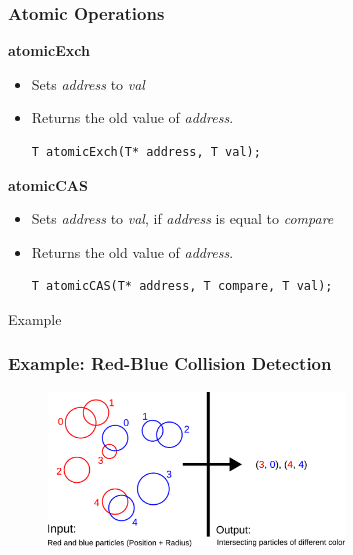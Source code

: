 \documentclass[aspectratio=169,handout]{beamer}
\begin{document}
\begin{frame}[fragile]
\frametitle{Atomic Operations}

\textbf{atomicExch}
\begin{itemize}
	\item Sets \textit{address} to \textit{val}
	\item Returns the old value of \textit{address}.
\begin{lstlisting}
T atomicExch(T* address, T val);
\end{lstlisting}
\end{itemize}

\textbf{atomicCAS}
\begin{itemize}
	\item Sets \textit{address} to \textit{val}, if \textit{address} is equal to \textit{compare}
	\item Returns the old value of \textit{address}.
\begin{lstlisting}
T atomicCAS(T* address, T compare, T val);
\end{lstlisting}
\end{itemize}
\end{frame}


\begin{frame}[fragile]
\begin{center}
\Large Example
\end{center}
\end{frame}


\frame
{
	\frametitle{Example: Red-Blue Collision Detection}
	\begin{figure}
		\includegraphics[width=0.7\textwidth]{red_blue_particles}
	\end{figure}
}
\end{document}
